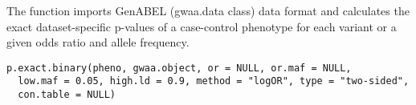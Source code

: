 \documentclass[a4paper]{book}
\begin{document}
%
\begin{SeeAlso}\relax
{}
\end{SeeAlso}
%
\begin{Description}\relax
The function imports GenABEL (gwaa.data class) data format
and calculates the exact dataset-specific p-values of a case-control
phenotype for each variant or a given odds ratio and allele frequency.
\end{Description}
%
\begin{Usage}
\begin{verbatim}
p.exact.binary(pheno, gwaa.object, or = NULL, or.maf = NULL,
  low.maf = 0.05, high.ld = 0.9, method = "logOR", type = "two-sided",
  con.table = NULL)
\end{verbatim}
\end{Usage}
%
\end{document}
